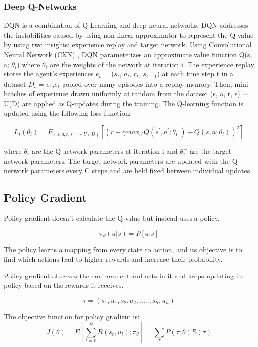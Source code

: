 \documentclass[12pt]{report}
\begin{document}
\subsubsection{Deep Q-Networks} DQN is a combination of Q-Learning and deep neural networks. DQN addresses the instabilities caused by using non-linear approximator to represent the Q-value by using two insights: experience replay and target network. 
Using Convolutional Neural Network (CNN) , DQN parameterizes an approximate value function Q(s, a; $\theta_i$) where $\theta_i$ are the weights of the network at iteration i. The experience replay stores the agent’s experiences $e_t$ = ($s_t$, $a_t$, $r_t$, $s_{t+1}$) at each time step t in a dataset $D_t$ = $e_1$,$e_t$ pooled over many episodes into a replay
memory. Then, mini batches of experience drawn uniformly at random from the dataset (s, a, r, s) $\sim$ U(D) are applied as Q-updates during the training. The Q-learning function is updated using the following loss function:

\begin{equation}\label{q_value_2}
	L_i (\theta_i) = E_{(s,a,r,s) \sim U(D) } [(r +  \gamma max_{a^{'}} Q(s^{'}, a^{'} ; \theta_i^{-}) - Q(s,a; \theta_{i}))^2]
\end{equation}

\hfill \break
where $\theta_i$ are the Q-network parameters at iteration i and $\theta_i^{-}$  are the target network parameters. The target network parameters are updated with the Q network parameters every C steps and are held fixed between individual updates. \\


\subsection{Policy Gradient} Policy gradient doesn't calculate the Q-value but instead uses a policy. 

\[ \pi_\theta (a | s) = P [ a | s ] \]

The policy learns a mapping from every state to action, and its objective is to find which actions lead to higher rewards and increase their probability. 

Policy gradient observes the environment and acts in it and keeps updating its policy based on the rewards it receives. 

\[ \tau = (s_1, u_1, s_2, u_2, ....., s_h, u_h ) \]

The objective function for policy gradient is:
\[ J(\theta) = E[\sum_{t=0}^{H} R(s_t, u_t); \pi_\theta] = \sum_{\tau} P(\tau;\theta) R(\tau) \] 
\end{document}

